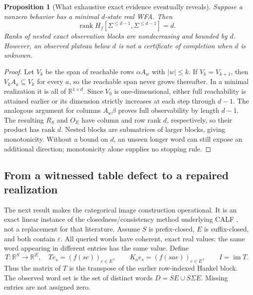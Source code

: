 \documentclass[11pt]{article}
\newtheorem{proposition}[theorem]{Proposition}
\theoremstyle{definition}
\theoremstyle{remark}
\begin{document}
\begin{proposition}[What exhaustive exact evidence eventually reveals]
\label{ce:eventual}
Suppose a nonzero behavior has a minimal $d$-state real WFA. Then
\[
 \operatorname{rank}H_f[\Sigma^{\leq d-1},\Sigma^{\leq d-1}]=d.
\]
Ranks of nested exact observation blocks are nondecreasing and bounded by
$d$. However, an observed plateau below $d$ is not a certificate of
completion when $d$ is unknown.
\end{proposition}
\begin{proof}
Let $V_k$ be the span of reachable rows $\alpha A_w$ with $|w|\leq k$.
If $V_k=V_{k+1}$, then $V_kA_a\subseteq V_k$ for every $a$, so the
reachable span never grows thereafter. In a minimal realization it is all
of $\mathbb R^{1\times d}$. Since $V_0$ is one-dimensional, either full
reachability is attained earlier or its dimension strictly increases at each
step through $d-1$. The analogous argument for columns $A_w\beta$ proves
full observability by length $d-1$. The resulting $R_S$ and $O_E$ have
column and row rank $d$, respectively, so their product has rank $d$.
Nested blocks are submatrices of larger blocks, giving monotonicity.
Without a bound on $d$, an unseen longer word can still expose an additional
direction; monotonicity alone supplies no stopping rule.
\end{proof}


\subsection{From a witnessed table defect to a repaired realization}
\label{ce:exact-interface}

The next result makes the categorical image construction operational. It is
an exact linear instance of the closedness/consistency method underlying
CALF \cite{ce:calf2017}, not a replacement for that literature.
Assume $S$ is prefix-closed, $E$ is suffix-closed, and both contain
$\varepsilon$. All queried words have coherent, exact real values: the same
word appearing in different entries has the same value. Define
\[
 T:\mathbb R^S\to\mathbb R^E,\quad
 Te_s=(f(se))_{e\in E},\qquad
 K_a e_s=(f(sae))_{e\in E},\qquad I=\operatorname{im}T.
\]
Thus the matrix of $T$ is the transpose of the earlier row-indexed Hankel
block. The observed word set is the set of distinct words
$D=SE\cup S\Sigma E$. Missing entries are not assigned zero.
\end{document}
